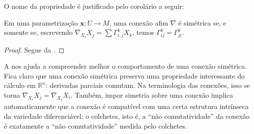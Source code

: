 O nome da propriedade é justificado pelo corolário a seguir:
\begin{corollary}
	\label{cor:conexao-simetrica}
	Em uma parametrização $\mathbf{x}:U\to M$, uma conexão afim $\nabla$ é simétrica se, e somente se, escrevendo $\nabla_{X_{i}}X_{j}=\sum \Gamma_{i,j}^{k}X_{k}$, temos $\Gamma_{ij}^{k}=\Gamma_{ji}^{k}$.
	\begin{proof}

		Segue da .
	\end{proof}
\end{corollary}
A  nos ajuda a compreender melhor o comportamento de uma conexão simétrica. Fica claro que uma conexão simétrica preserva uma propriedade interessante do cálculo em $\mathbb{R}^{n}$: derivadas parciais comutam. Na terminologia das conexões, isso se torna $\nabla_{X_{i}}X_{j}=\nabla_{X_{j}}X_{i}$. Também, impor simetria sobre uma conexão implica automaticamente que a conexão é compatível com uma certa estrutura intrínseca da variedade diferenciável: o colchetes, isto é, a ``não comutatividade'' da conexão é exatamente a ``não comutatividade'' medida pelo colchetes.

